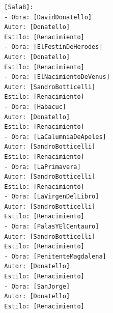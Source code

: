 \documentclass[a4paper]{article}
\begin{document}
\begin{verbatim}
		[Sala8]:
		- Obra: [DavidDonatello]
		Autor: [Donatello]
		Estilo: [Renacimiento]
		- Obra: [ElFestínDeHerodes]
		Autor: [Donatello]
		Estilo: [Renacimiento]
		- Obra: [ElNacimientoDeVenus]
		Autor: [SandroBotticelli]
		Estilo: [Renacimiento]
		- Obra: [Habacuc]
		Autor: [Donatello]
		Estilo: [Renacimiento]
		- Obra: [LaCalumniaDeApeles]
		Autor: [SandroBotticelli]
		Estilo: [Renacimiento]
		- Obra: [LaPrimavera]
		Autor: [SandroBotticelli]
		Estilo: [Renacimiento]
		- Obra: [LaVirgenDelLibro]
		Autor: [SandroBotticelli]
		Estilo: [Renacimiento]
		- Obra: [PalasYElCentauro]
		Autor: [SandroBotticelli]
		Estilo: [Renacimiento]
		- Obra: [PenitenteMagdalena]
		Autor: [Donatello]
		Estilo: [Renacimiento]
		- Obra: [SanJorge]
		Autor: [Donatello]
		Estilo: [Renacimiento]
		
		
	\end{verbatim}
	
	
\end{document}
